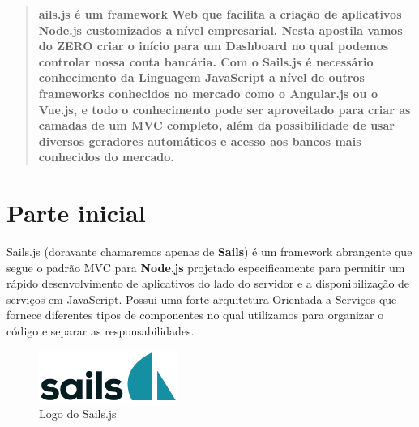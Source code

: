 \documentclass[a4paper,11pt]{article}
\begin{document}
	
	\maketitle %
	\thispagestyle{fancy} %
	

\begin{abstract}
\textbf{ails.js \cite{sailsoficial} é um framework Web que facilita 
a criação de aplicativos Node.js \cite{node} customizados a nível empresarial. Nesta apostila vamos do ZERO criar o início para um \textbf{Dashboard} no qual podemos controlar nossa conta bancária. Com o Sails.js é necessário conhecimento da Linguagem JavaScript a nível de outros frameworks conhecidos no mercado como o \textbf{Angular.js} ou o \textbf{Vue.js}, e todo o conhecimento pode ser aproveitado para criar as camadas de um MVC completo, além da possibilidade de usar diversos geradores automáticos e acesso aos bancos mais conhecidos do mercado.}
\end{abstract}

\section{Parte inicial}
Sails.js (doravante chamaremos apenas de \textbf{Sails}) é um framework abrangente que segue o padrão MVC para \textbf{Node.js} projetado especificamente para permitir um rápido desenvolvimento de aplicativos do lado do servidor e a disponibilização de serviços em JavaScript. Possui uma forte arquitetura Orientada a Serviços que fornece diferentes tipos de componentes no qual utilizamos para organizar o código e separar as responsabilidades. 
\begin{figure}[H]
	\centering
	\includegraphics[width=0.4\textwidth]{imagens/sails.png}
	\caption{Logo do Sails.js}
\end{figure}
\end{document}

